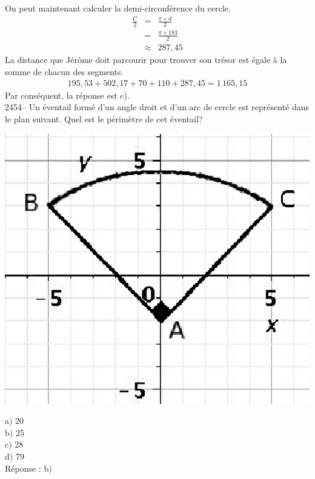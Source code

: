 \documentclass[letterpaper, 12pt]{article}
\begin{document}
On peut maintenant calculer la demi-circonf\'erence du cercle.
\begin{eqnarray*}
 \frac{C}{2}&=&\frac{\pi \times d}{2}\\[2mm]
&=&\frac{\pi \times 183}{2}\\[2mm]
&\approx&287,45
\end{eqnarray*}
La distance que J\'er\^ome doit parcourir pour trouver son tr\'esor est \'egale \`a la somme de chacun des segments.
\begin{eqnarray*}
 195,53+502,17+70+110+287,45=1\,165,15
\end{eqnarray*}
Par cons\'equent, la r\'eponse est c).\\

2454-- Un \'eventail form\'e d'un angle droit et d'un arc de cercle est repr\'esent\'e dans le plan suivant. Quel est le p\'erim\`etre de cet \'eventail?\\
\begin{center}
 \includegraphics[width=5CM,bb=14 14 259 231]{Q2454.eps}
\end{center}

a$)$ 20\\
b$)$ 25\\
c$)$ 28\\
d$)$ 79\\

R\'eponse : b$)$\\
\end{document}
